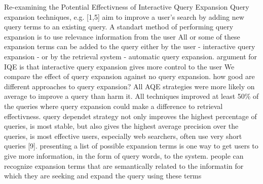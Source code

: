 Re-examining the Potential Effectivness of Interactive Query Expansion
Query expansion techniques, e.g. [1,5] aim to improve a user's search by adding new query terms to an existing query. A standart method of performing query expansion is to use relevance information from the user
All or some of these expansion terms can be added to the query either by the user - interactive query expansion - or by the retrieval system - automatic query expansion.
argument for IQE is that interactive query expansion gives more control to the user
We compare the effect of query expansion against no query expansion. how good are different approaches to query expansion? 
All AQE strategies were more likely on average to improve a query than harm it. All techniques improved at least 50\% of the queries where query expansion could make a difference to retrieval effectivness.
query dependet strategy not only improves the highest percentage of queries, is most stable, but also gives the highest average precision over the queries, is most effective
users, especially web searchers, often use very short queries [9]. presenting a list of possible expansion terms is one way to get users to give more information, in the form of query words, to the system.
people can recognize expansion terms that are semantically related to the informatin for which they are seeking and expand the query using these terms